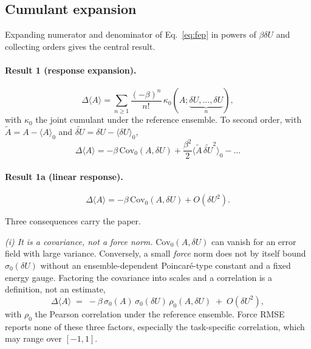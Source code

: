 \documentclass[aip,jcp,reprint,amsmath,amssymb,floatfix]{revtex4-2}
\newcommand{\dU}{\ensuremath{\delta U}}
\newcommand{\avg}[1]{\ensuremath{\langle #1 \rangle}}
\newcommand{\avgz}[1]{\ensuremath{\langle #1 \rangle_{0}}}
\newcommand{\Cov}{\ensuremath{\mathrm{Cov}}}
\begin{document}
\subsection{Cumulant expansion}
\label{sec:cumulant}

Expanding numerator and denominator of Eq.~\eqref{eq:fep} in powers of
$\beta\dU$ and collecting orders gives the central result.

\paragraph*{Result 1 (response expansion).}
\begin{equation}
\Delta\avg{A} = \sum_{n \ge 1} \frac{(-\beta)^n}{n!}\,
\kappa_0\!\left(A; \underbrace{\dU,\dots,\dU}_{n}\right),
\label{eq:cumulants}
\end{equation}
with $\kappa_0$ the joint cumulant under the reference ensemble. To
second order, with $\tilde A = A - \avgz{A}$ and
$\widetilde{\dU} = \dU - \avgz{\dU}$,
\begin{equation}
\Delta\avg{A} = -\beta\,\Cov_0(A,\dU)
 + \frac{\beta^2}{2}\big\langle \tilde A\,\widetilde{\dU}^2 \big\rangle_0 - \dots
\end{equation}

\paragraph*{Result 1a (linear response).}
\begin{equation}
\Delta\avg{A} = -\beta\,\Cov_0(A, \dU) + O(\dU^2).
\label{eq:linear}
\end{equation}

Three consequences carry the paper.

\emph{(i) It is a covariance, not a force norm.} $\Cov_0(A,\dU)$ can vanish
for an error field with large variance. Conversely, a small \emph{force} norm
does not by itself bound $\sigma_0(\dU)$ without an ensemble-dependent
Poincar\'e-type constant and a fixed energy gauge. Factoring the covariance into
scales and a correlation is a definition,
not an estimate,
\begin{equation}
\Delta\avg{A} \;=\; -\beta\,\sigma_0(A)\,\sigma_0(\dU)\,
\rho_0(A,\dU) \;+\; O(\dU^2),
\label{eq:cs}
\end{equation}
with $\rho_0$ the Pearson correlation under the reference ensemble.
Force RMSE reports none of these three factors, especially the task-specific
correlation, which may range over $[-1,1]$.
\end{document}

